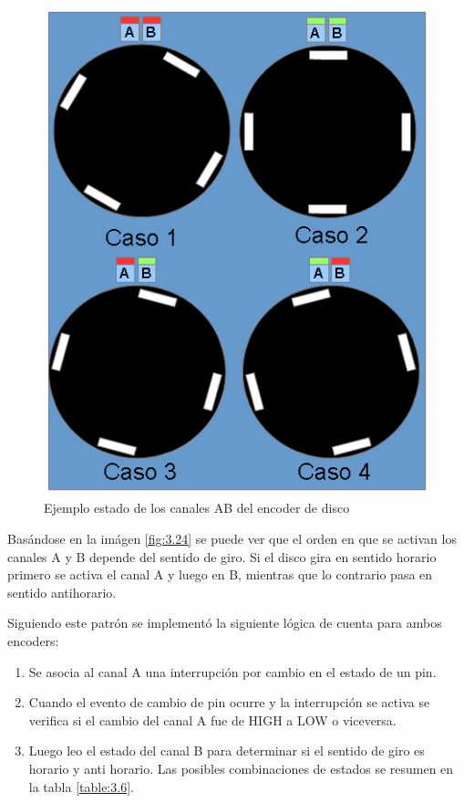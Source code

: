\begin{figure}[!ht]
	\centering
	\includegraphics[width=15cm,scale=1]{resources/3_24-encoderDiscoAB.png}
	\caption{Ejemplo estado de los canales AB del encoder de disco}
	\label{fig:\thefigure}
\end{figure}

Basándose en la imágen \ref{fig:3.24} se puede ver que el orden en que se activan los canales A y B depende del sentido de giro. Si el disco gira en sentido horario primero se activa el canal A y luego en B, mientras que lo contrario pasa en sentido antihorario.

Siguiendo este patrón se implementó la siguiente lógica de cuenta para ambos encoders:
\begin{enumerate}
	\item Se asocia al canal A una interrupción por cambio en el estado de un pin.
	\item Cuando el evento de cambio de pin ocurre y la interrupción se activa se verifica si el cambio del canal A fue de HIGH a LOW o viceversa. 
	\item Luego leo el estado del canal B para determinar si el sentido de giro es horario y anti horario. Las posibles combinaciones de estados se resumen en la tabla \ref{table:3.6}.
\end{enumerate}

